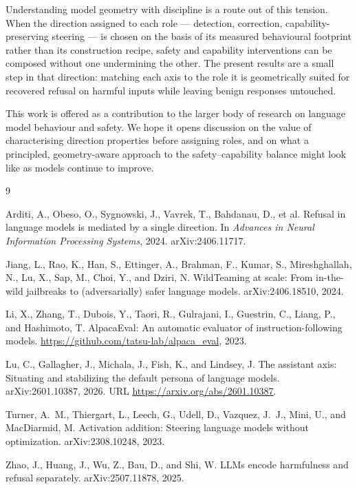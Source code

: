 \documentclass{article}
\begin{document}
Understanding model geometry with discipline is a route out of this
tension. When the direction assigned to each role --- detection,
correction, capability-preserving steering --- is chosen on the
basis of its measured behavioural footprint rather than its
construction recipe, safety and capability interventions can be
composed without one undermining the other. The present results are
a small step in that direction: matching each axis to the role it
is geometrically suited for recovered refusal on harmful inputs
while leaving benign responses untouched.

This work is offered as a contribution to the larger body of
research on language model behaviour and safety. We hope it opens
discussion on the value of characterising direction properties
before assigning roles, and on what a principled,
geometry-aware approach to the safety--capability balance might
look like as models continue to improve.

\clearpage


% 

\begin{thebibliography}{9}

Arditi, A., Obeso, O., Sygnowski, J., Vavrek, T., Bahdanau, D., et al.
\newblock Refusal in language models is mediated by a single direction.
\newblock In \emph{Advances in Neural Information Processing Systems}, 2024.
\newblock arXiv:2406.11717.

Jiang, L., Rao, K., Han, S., Ettinger, A., Brahman, F., Kumar, S.,
Mireshghallah, N., Lu, X., Sap, M., Choi, Y., and Dziri, N.
\newblock WildTeaming at scale: From in-the-wild jailbreaks to
         (adversarially) safer language models.
\newblock arXiv:2406.18510, 2024.

Li, X., Zhang, T., Dubois, Y., Taori, R., Gulrajani, I., Guestrin, C.,
Liang, P., and Hashimoto, T.
\newblock AlpacaEval: An automatic evaluator of instruction-following models.
\newblock \url{https://github.com/tatsu-lab/alpaca_eval}, 2023.

Lu, C., Gallagher, J., Michala, J., Fish, K., and Lindsey, J.
\newblock The assistant axis: Situating and stabilizing the default persona
         of language models.
\newblock arXiv:2601.10387, 2026.
\newblock URL \url{https://arxiv.org/abs/2601.10387}.

Turner, A.~M., Thiergart, L., Leech, G., Udell, D., Vazquez, J.~J.,
Mini, U., and MacDiarmid, M.
\newblock Activation addition: Steering language models without optimization.
\newblock arXiv:2308.10248, 2023.

Zhao, J., Huang, J., Wu, Z., Bau, D., and Shi, W.
\newblock LLMs encode harmfulness and refusal separately.
\newblock arXiv:2507.11878, 2025.

\end{thebibliography}
\end{document}
